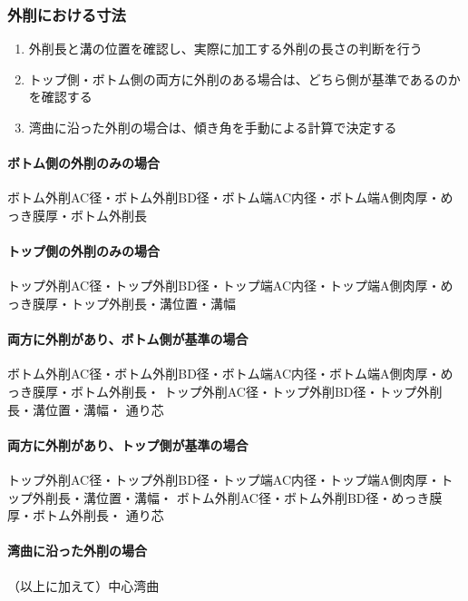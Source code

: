 \subsubsection{外削における寸法}
\begin{enumerate}
\item {}外削長と溝の位置を確認し、実際に加工する外削の長さの判断を行う
\item トップ側・ボトム側の両方に外削のある場合は、どちら側が基準であるのかを確認する
\item 湾曲に沿った外削の場合は、傾き角を手動による計算で決定する
\end{enumerate}
\begin{Tabbox}[title={必要な図面上のパラメタ}]\small
\paragraph*{ボトム側の外削のみの場合}
ボトム外削AC径・ボトム外削BD径・ボトム端AC内径・ボトム端A側肉厚・めっき膜厚・ボトム外削長
\tcbline*
\paragraph*{トップ側の外削のみの場合}
トップ外削AC径・トップ外削BD径・トップ端AC内径・トップ端A側肉厚・めっき膜厚・トップ外削長・溝位置・溝幅
\tcbline*
\paragraph*{両方に外削があり、ボトム側が基準の場合}
ボトム外削AC径・ボトム外削BD径・ボトム端AC内径・ボトム端A側肉厚・めっき膜厚・ボトム外削長・
トップ外削AC径・トップ外削BD径・トップ外削長・溝位置・溝幅・
通り芯
\tcbline*
\paragraph*{両方に外削があり、トップ側が基準の場合}
トップ外削AC径・トップ外削BD径・トップ端AC内径・トップ端A側肉厚・トップ外削長・溝位置・溝幅・
ボトム外削AC径・ボトム外削BD径・めっき膜厚・ボトム外削長・
通り芯
\tcbline*
\paragraph*{湾曲に沿った外削の場合}
（以上に加えて）中心湾曲
\end{Tabbox}

\clearpage
